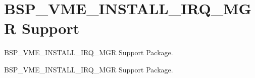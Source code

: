 \hypertarget{group__powerpc__vme}{}\section{B\+S\+P\+\_\+\+V\+M\+E\+\_\+\+I\+N\+S\+T\+A\+L\+L\+\_\+\+I\+R\+Q\+\_\+\+M\+GR Support}
\label{group__powerpc__vme}


B\+S\+P\+\_\+\+V\+M\+E\+\_\+\+I\+N\+S\+T\+A\+L\+L\+\_\+\+I\+R\+Q\+\_\+\+M\+GR Support Package.  


B\+S\+P\+\_\+\+V\+M\+E\+\_\+\+I\+N\+S\+T\+A\+L\+L\+\_\+\+I\+R\+Q\+\_\+\+M\+GR Support Package. 

